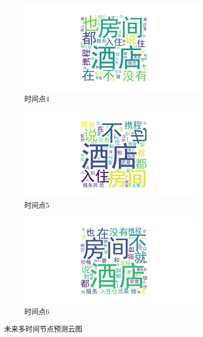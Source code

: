 \documentclass[UTF8,a4paper,15pt,titlepage,oneside]{ctexbook}
\begin{document}
\begin{figure}[htbp]
  \vspace{0.2em} %
  
  \begin{subfigure}{0.32\textwidth}
    \includegraphics[width=\linewidth]{pictures/17.png}
    \caption{时间点4}
  \end{subfigure}
  \hfill
  \begin{subfigure}{0.32\textwidth}
    \includegraphics[width=\linewidth]{pictures/18.png}
    \caption{时间点5}
  \end{subfigure}
  \hfill
  \begin{subfigure}{0.32\textwidth}
    \includegraphics[width=\linewidth]{pictures/19.png}
    \caption{时间点6}
  \end{subfigure}
  
  \caption{未来多时间节点预测云图}
  \end{figure}
\end{document}
